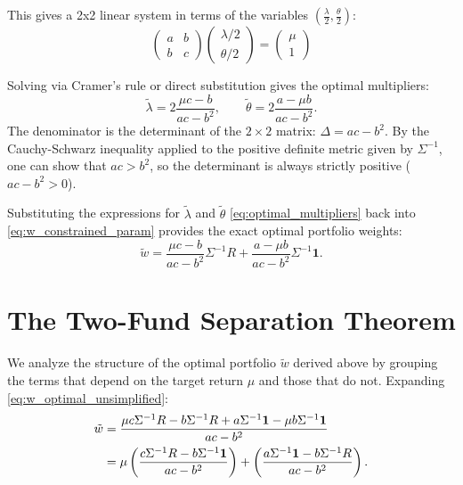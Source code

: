 This gives a 2x2 linear system in terms of the variables $(\frac{\lambda}{2}, \frac{\theta}{2})$:
\begin{equation*}
    \begin{pmatrix} a & b \\ b & c \end{pmatrix} \begin{pmatrix} \lambda/2 \\ \theta/2 \end{pmatrix} = \begin{pmatrix} \mu \\ 1 \end{pmatrix}
\end{equation*}

Solving via Cramer's rule or direct substitution gives the optimal multipliers:
\begin{equation}
    \tilde{\lambda} = 2 \frac{\mu c - b}{ac - b^2}, \quad \quad \tilde{\theta} = 2 \frac{a - \mu b}{ac - b^2}. \label{eq:optimal_multipliers}
\end{equation}
The denominator is the determinant of the $2 \times 2$ matrix: $\Delta = ac - b^2$. By the Cauchy-Schwarz inequality applied to the positive definite metric given by $\Sigma^{-1}$, one can show that $ac > b^2$, so the determinant is always strictly positive ($ac - b^2 > 0$).

Substituting the expressions for $\tilde{\lambda}$ and $\tilde{\theta}$ \eqref{eq:optimal_multipliers} back into \eqref{eq:w_constrained_param} provides the exact optimal portfolio weights:
\begin{equation}
    \tilde{w} = \frac{\mu c - b}{ac - b^2} \Sigma^{-1} R + \frac{a - \mu b}{ac - b^2} \Sigma^{-1} \mathbf{1}. \label{eq:w_optimal_unsimplified}
\end{equation}

\section{The Two-Fund Separation Theorem}

We analyze the structure of the optimal portfolio $\tilde{w}$ derived above by grouping the terms that depend on the target return $\mu$ and those that do not.
Expanding \eqref{eq:w_optimal_unsimplified}:
\begin{align}
    \tilde{w} &= \frac{\mu c \Sigma^{-1} R - b \Sigma^{-1} R + a \Sigma^{-1} \mathbf{1} - \mu b \Sigma^{-1} \mathbf{1}}{ac - b^2} \notag \\
    &= \mu \left( \frac{c \Sigma^{-1} R - b \Sigma^{-1} \mathbf{1}}{ac - b^2} \right) + \left( \frac{a \Sigma^{-1} \mathbf{1} - b \Sigma^{-1} R}{ac - b^2} \right).
\end{align}

